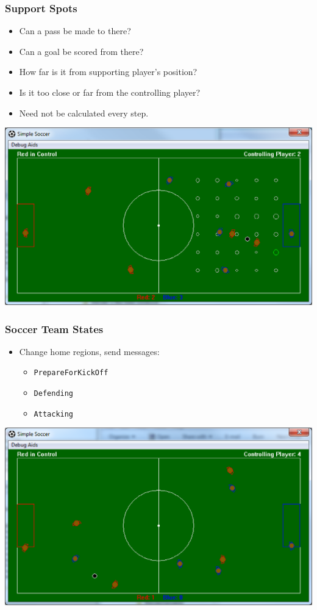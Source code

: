 \documentclass[handout,t,compress]{beamer}
\newcommand{\bframe}[1]{\begin{frame}[fragile]\frametitle{#1}}
\newcommand{\bi}{\begin{itemize}}
\newcommand{\li}{\item}
\newcommand{\ei}{\end{itemize}}
\begin{document}
\bframe{Support Spots}
\scriptsize
\begin{itemize}
\item Can a pass be made to there?
\item Can a goal be scored from there?
\item How far is it from supporting player's position?
\item Is it too close or far from  the controlling player?
\item Need not be calculated every step.
\end{itemize}
\includegraphics[scale=0.4]{simplesoccersupportspots.eps}
\end{frame}

\bframe{Soccer Team States}
\bi
\li  Change home regions, send messages:
\begin{itemize}
\item {\tt PrepareForKickOff}
\item {\tt Defending}
\item {\tt Attacking}
\end{itemize}
\ei
\includegraphics[scale=0.4]{simplesoccergame.eps}
\end{frame}
\end{document}

